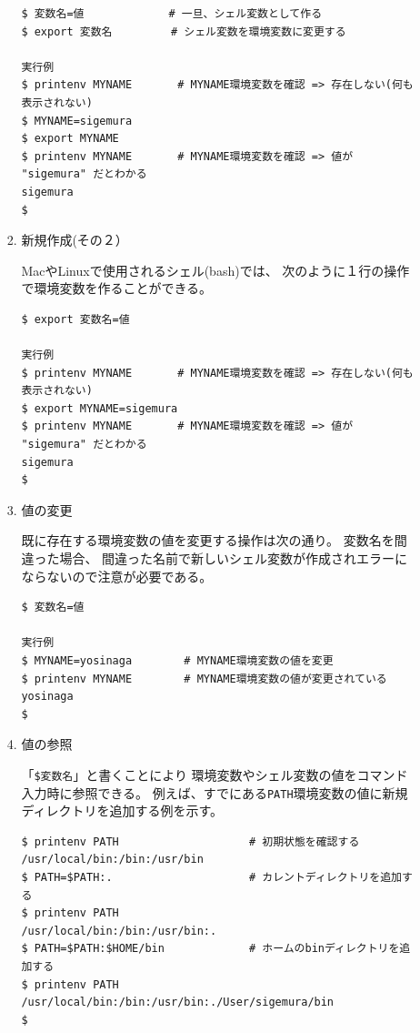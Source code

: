 \documentclass[a4j,dvipdfmx]{jarticle}
\begin{document}
\begin{enumerate}
\begin{enumerate}
\begin{enumerate}
\begin{lstlisting}[numbers=none]
$ 変数名=値             # 一旦、シェル変数として作る
$ export 変数名         # シェル変数を環境変数に変更する

実行例
$ printenv MYNAME       # MYNAME環境変数を確認 => 存在しない(何も表示されない)
$ MYNAME=sigemura
$ export MYNAME
$ printenv MYNAME       # MYNAME環境変数を確認 => 値が "sigemura" だとわかる
sigemura
$
\end{lstlisting}

\item 新規作成(その２）

MacやLinuxで使用されるシェル(bash)では、
次のように１行の操作で環境変数を作ることができる。

\begin{lstlisting}[numbers=none]
$ export 変数名=値

実行例
$ printenv MYNAME       # MYNAME環境変数を確認 => 存在しない(何も表示されない)
$ export MYNAME=sigemura
$ printenv MYNAME       # MYNAME環境変数を確認 => 値が "sigemura" だとわかる
sigemura
$
\end{lstlisting}

\item 値の変更

既に存在する環境変数の値を変更する操作は次の通り。
変数名を間違った場合、
間違った名前で新しいシェル変数が作成されエラーにならないので注意が必要である。

\begin{lstlisting}[numbers=none]
$ 変数名=値

実行例
$ MYNAME=yosinaga        # MYNAME環境変数の値を変更
$ printenv MYNAME        # MYNAME環境変数の値が変更されている
yosinaga
$
\end{lstlisting}

\item 値の参照

「\verb/$変数名/」と書くことにより
環境変数やシェル変数の値をコマンド入力時に参照できる。
例えば、すでにある\verb/PATH/環境変数の値に新規ディレクトリを追加する例を示す。
\begin{lstlisting}[numbers=none]
$ printenv PATH                    # 初期状態を確認する
/usr/local/bin:/bin:/usr/bin
$ PATH=$PATH:.                     # カレントディレクトリを追加する
$ printenv PATH
/usr/local/bin:/bin:/usr/bin:.
$ PATH=$PATH:$HOME/bin             # ホームのbinディレクトリを追加する
$ printenv PATH
/usr/local/bin:/bin:/usr/bin:./User/sigemura/bin
$
\end{lstlisting}


\end{enumerate}
\end{enumerate}
\end{enumerate}
\end{document}
